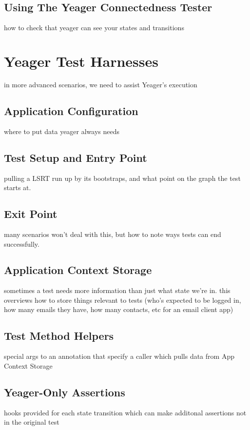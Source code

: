 \subsection{Using The Yeager Connectedness Tester}
how to check that yeager can see your states and transitions %

\section{Yeager Test Harnesses}
in more advanced scenarios, we need to assist Yeager's execution %

\subsection{Application Configuration}
where to put data yeager always needs %

\subsection{Test Setup and Entry Point}
pulling a LSRT run up by its bootstraps, and what point on the graph the test starts at. %

\subsection{Exit Point}
many scenarios won't deal with this, but how to note ways tests can end successfully. %

\subsection{Application Context Storage}
sometimes a test needs more information than just what state we're in. this overviews how to store things relevant to tests (who's expected to be logged in, how many emails they have, how many contacts, etc for an email client app) %

\subsection{Test Method Helpers}
special args to an annotation that specify a caller which pulls data from App Context Storage %

\subsection{Yeager-Only Assertions}
hooks provided for each state transition which can make additonal assertions not in the original test %

